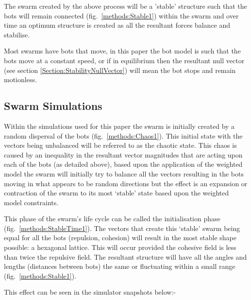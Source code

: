 \documentclass[10pt,journal,letterpaper,twoside]{IEEEtran}
\newcommand{\Fig}{fig.}
\begin{document}
The swarm created by the above process will be a 'stable' structure
such that the bots will remain connected
(\Fig{}~\ref{methods:Stable1}) within the swarm and over time an
optimum structure is created as all the resultant forces balance and
stabilise.

Most swarms have bots that move, in this paper the bot model is such
that the bots move at a constant speed, or if in equilibrium then the
resultant null vector (see section \ref{Section:StabilityNullVector})
will mean the bot stops and remain motionless.

\subsection{Swarm Simulations}

Within the simulations used for this paper the swarm is initially
created by a random dispersal of the bots
(\Fig{}~\ref{methods:Chaos1}). This initial state with the vectors
being unbalanced will be referred to as the chaotic state. This chaos
is caused by an inequality in the resultant vector magnitudes that are
acting upon each of the bots (as detailed above), based upon the
application of the weighted model the swarm will initially try to
balance all the vectors resulting in the bots moving in what appears
to be random directions but the effect is an expansion or contraction
of the swarm to its most `stable' state based upon the weighted model
constraints.

This phase of the swarm's life cycle can be called the initialisation
phase (\Fig{}~\ref{methods:StableTime1}). The vectors that create this
`stable' swarm being equal for all the bots (repulsion, cohesion) will
result in the most stable shape possible: a hexagonal lattice. This
will occur provided the cohesive field is less than twice the
repulsive field. The resultant structure will have all the angles and
lengths (distances between bots) the same or fluctuating within a
small range (\Fig{}~\ref{methods:Stable1}).

This effect can be seen in the simulator snapshots below:-
\end{document}
